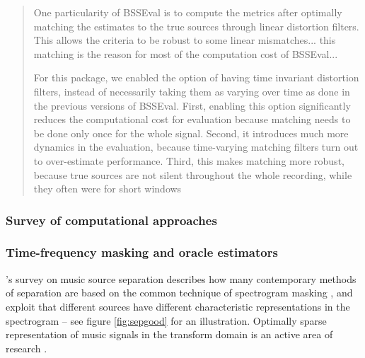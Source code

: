 \documentclass[report.tex]{subfiles}
\begin{document}
\begin{quote}
	One particularity of BSSEval is to compute the metrics after optimally matching the estimates to the true sources through linear distortion filters. This allows the criteria to be robust to some linear mismatches... this matching is the reason for most of the computation cost of BSSEval...

	For this package, we enabled the option of having time invariant distortion filters, instead of necessarily taking them as varying over time as done in the previous versions of BSSEval. First, enabling this option significantly reduces the computational cost for evaluation because matching needs to be done only once for the whole signal. Second, it introduces much more dynamics in the evaluation, because time-varying matching filters turn out to over-estimate performance. Third, this makes matching more robust, because true sources are not silent throughout the whole recording, while they often were for short windows
\end{quote}

\subsubsection{Survey of computational approaches}



\subsubsection{Time-frequency masking and oracle estimators}



\textcite{musicsepgood}'s survey on music source separation describes how many contemporary methods of separation are based on the common technique of spectrogram masking \cite{masking, speechmask, musicmask}, and exploit that different sources have different characteristic representations in the spectrogram -- see figure \ref{fig:sepgood} for an illustration. Optimally sparse representation of music signals in the transform domain is an active area of research \cite{sparsitykowalski, sparsitykowalski2}.
\end{document}
